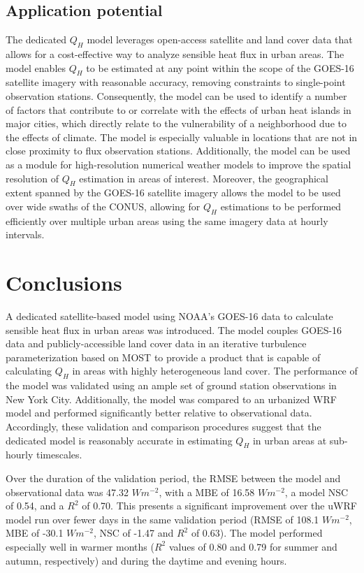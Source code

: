 \subsection{Application potential}
The dedicated $Q_H$ model leverages open-access satellite and land cover data that allows for a cost-effective way to analyze sensible heat flux in urban areas. The model enables $Q_H$ to be estimated at any point within the scope of the GOES-16 satellite imagery with reasonable accuracy, removing constraints to single-point observation stations. Consequently, the model can be used to identify a number of factors that contribute to or correlate with the effects of urban heat islands in major cities, which directly relate to the vulnerability of a neighborhood due to the effects of climate. The model is especially valuable in locations that are not in close proximity to flux observation stations. Additionally, the model can be used as a module for high-resolution numerical weather models to improve the spatial resolution of $Q_H$ estimation in areas of interest. Moreover, the geographical extent spanned by the GOES-16 satellite imagery allows the model to be used over wide swaths of the CONUS, allowing for $Q_H$ estimations to be performed efficiently over multiple urban areas using the same imagery data at hourly intervals.


\section{Conclusions}
A dedicated satellite-based model using NOAA's GOES-16 data to calculate sensible heat flux in urban areas was introduced. The model couples GOES-16 data and publicly-accessible land cover data in an iterative turbulence parameterization based on MOST to provide a product that is capable of calculating $Q_H$ in areas with highly heterogeneous land cover. The performance of the model was validated using an ample set of ground station observations in New York City. Additionally, the model was compared to an urbanized WRF model and performed significantly better relative to observational data. Accordingly, these validation and comparison procedures suggest that the dedicated model is reasonably accurate in estimating $Q_H$ in urban areas at sub-hourly timescales. 

Over the duration of the validation period, the RMSE between the model and observational data was 47.32 $W m^{-2}$, with a MBE of 16.58 $W m^{-2}$, a model NSC of 0.54, and a $R^2$ of 0.70. This presents a significant improvement over the uWRF model run over fewer days in the same validation period (RMSE of 108.1 $W m^{-2}$, MBE of -30.1 $W m^{-2}$, NSC of -1.47 and $R^2$ of 0.63). The model performed especially well in warmer months ($R^2$ values of 0.80 and 0.79 for summer and autumn, respectively) and during the daytime and evening hours. 

